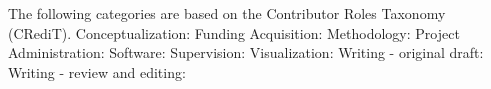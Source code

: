\noindent
The following categories are based on the Contributor Roles Taxonomy (CRediT). 
Conceptualization:
Funding Acquisition:	
Methodology:	
Project Administration:	
Software:	
Supervision:	
Visualization:	
Writing - original draft:	
Writing - review and editing: